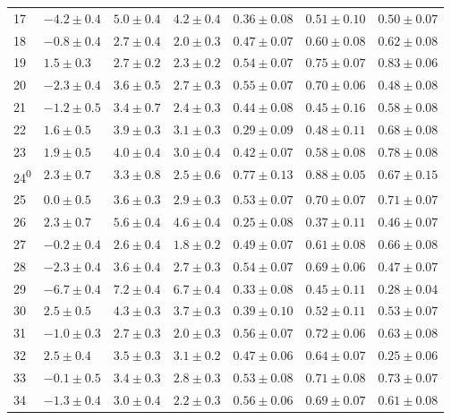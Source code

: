 \begin{tabular}{l l l l l l l}
17 & $-4.2 \pm 0.4$ & $5.0 \pm 0.4$ & $4.2 \pm 0.4$ & $0.36 \pm 0.08$ & $0.51 \pm 0.10$ & $0.50 \pm 0.07$ \\ 
18 & $-0.8 \pm 0.4$ & $2.7 \pm 0.4$ & $2.0 \pm 0.3$ & $0.47 \pm 0.07$ & $0.60 \pm 0.08$ & $0.62 \pm 0.08$ \\ 
19 & $1.5 \pm 0.3$ & $2.7 \pm 0.2$ & $2.3 \pm 0.2$ & $0.54 \pm 0.07$ & $0.75 \pm 0.07$ & $0.83 \pm 0.06$ \\ 
20 & $-2.3 \pm 0.4$ & $3.6 \pm 0.5$ & $2.7 \pm 0.3$ & $0.55 \pm 0.07$ & $0.70 \pm 0.06$ & $0.48 \pm 0.08$ \\ 
21 & $-1.2 \pm 0.5$ & $3.4 \pm 0.7$ & $2.4 \pm 0.3$ & $0.44 \pm 0.08$ & $0.45 \pm 0.16$ & $0.58 \pm 0.08$ \\ 
22 & $1.6 \pm 0.5$ & $3.9 \pm 0.3$ & $3.1 \pm 0.3$ & $0.29 \pm 0.09$ & $0.48 \pm 0.11$ & $0.68 \pm 0.08$ \\ 
23 & $1.9 \pm 0.5$ & $4.0 \pm 0.4$ & $3.0 \pm 0.4$ & $0.42 \pm 0.07$ & $0.58 \pm 0.08$ & $0.78 \pm 0.08$ \\ 
24\textsuperscript{0} & $2.3 \pm 0.7$ & $3.3 \pm 0.8$ & $2.5 \pm 0.6$ & $0.77 \pm 0.13$ & $0.88 \pm 0.05$ & $0.67 \pm 0.15$ \\ 
25 & $0.0 \pm 0.5$ & $3.6 \pm 0.3$ & $2.9 \pm 0.3$ & $0.53 \pm 0.07$ & $0.70 \pm 0.07$ & $0.71 \pm 0.07$ \\ 
26 & $2.3 \pm 0.7$ & $5.6 \pm 0.4$ & $4.6 \pm 0.4$ & $0.25 \pm 0.08$ & $0.37 \pm 0.11$ & $0.46 \pm 0.07$ \\ 
27 & $-0.2 \pm 0.4$ & $2.6 \pm 0.4$ & $1.8 \pm 0.2$ & $0.49 \pm 0.07$ & $0.61 \pm 0.08$ & $0.66 \pm 0.08$ \\ 
28 & $-2.3 \pm 0.4$ & $3.6 \pm 0.4$ & $2.7 \pm 0.3$ & $0.54 \pm 0.07$ & $0.69 \pm 0.06$ & $0.47 \pm 0.07$ \\ 
29 & $-6.7 \pm 0.4$ & $7.2 \pm 0.4$ & $6.7 \pm 0.4$ & $0.33 \pm 0.08$ & $0.45 \pm 0.11$ & $0.28 \pm 0.04$ \\ 
30 & $2.5 \pm 0.5$ & $4.3 \pm 0.3$ & $3.7 \pm 0.3$ & $0.39 \pm 0.10$ & $0.52 \pm 0.11$ & $0.53 \pm 0.07$ \\ 
31 & $-1.0 \pm 0.3$ & $2.7 \pm 0.3$ & $2.0 \pm 0.3$ & $0.56 \pm 0.07$ & $0.72 \pm 0.06$ & $0.63 \pm 0.08$ \\ 
32 & $2.5 \pm 0.4$ & $3.5 \pm 0.3$ & $3.1 \pm 0.2$ & $0.47 \pm 0.06$ & $0.64 \pm 0.07$ & $0.25 \pm 0.06$ \\ 
33 & $-0.1 \pm 0.5$ & $3.4 \pm 0.3$ & $2.8 \pm 0.3$ & $0.53 \pm 0.08$ & $0.71 \pm 0.08$ & $0.73 \pm 0.07$ \\ 
34 & $-1.3 \pm 0.4$ & $3.0 \pm 0.4$ & $2.2 \pm 0.3$ & $0.56 \pm 0.06$ & $0.69 \pm 0.07$ & $0.61 \pm 0.08$ \\ 

\end{tabular}
